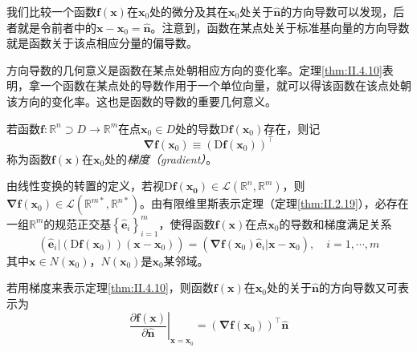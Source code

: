 \documentclass[../main.tex]{subfiles}
\begin{document}
我们比较一个函数$\mathbf{f}\left(\mathbf{x}\right)$在$\mathbf{x}_0$处的微分及其在$\mathbf{x}_0$处关于$\mathbf{\hat{n}}$的方向导数可以发现，后者就是令前者中的$\mathbf{x}-\mathbf{x}_0=\mathbf{\hat{n}}$。注意到，函数在某点处关于标准基向量的方向导数就是函数关于该点相应分量的偏导数。

方向导数的几何意义是函数在某点处朝相应方向的变化率。定理\ref{thm:II.4.10}表明，拿一个函数在某点处的导数作用于一个单位向量，就可以得该函数在该点处朝该方向的变化率。这也是函数的导数的重要几何意义。

\begin{definition}[向量函数的梯度]\label{def:II.4.19}
    若函数$\mathbf{f}:\mathbb{R}^n\supset D\rightarrow\mathbb{R}^m$在点$\mathbf{x}_0\in D$处的导数$\mathrm{D}\mathbf{f}\left(\mathbf{x}_0\right)$存在，则记
    \[\mathbf{\nabla}\mathbf{f}\left(\mathbf{x}_0\right)\equiv\left(\mathrm{D}\mathbf{f}\left(\mathbf{x}_0\right)\right)^\intercal\]
    称为函数$\mathbf{f}\left(\mathbf{x}\right)$在$\mathbf{x}_0$处的\emph{梯度（gradient）}。
\end{definition}

由线性变换的转置的定义，若视$\mathrm{D}\mathbf{f}\left(\mathbf{x_0}\right)\in\mathcal{L}\left(\mathbb{R}^n,\mathbb{R}^m\right)$，则$\mathbf{\nabla}\mathbf{f}\left(\mathbf{x}_0\right)\in\mathcal{L}\left(\mathbb{R}^{m*},\mathbb{R}^{n*}\right)$。由有限维里斯表示定理（定理\ref{thm:II.2.19}），必存在一组$\mathbb{R}^m$的规范正交基$\left\{\mathbf{\hat{e}}_i\right\}_{i=1}^m$，使得函数$\mathbf{f}\left(\mathbf{x}\right)$在点$\mathbf{x}_0$的导数和梯度满足关系
\[\left(\mathbf{\hat{e}}_i|\left(\mathrm{D}\mathbf{f}\left(\mathbf{x}_0\right)\right)\left(\mathbf{x}-\mathbf{x}_0\right)\right)=\left(\mathbf{\nabla}\mathbf{f}\left(\mathbf{x}_0\right)\mathbf{\hat{e}}_i|\mathbf{x}-\mathbf{x}_0\right),\quad i=1,\cdots,m\]
其中$\mathbf{x}\in N\left(\mathbf{x}_0\right)$，$N\left(\mathbf{x}_0\right)$是$\mathbf{x}_0$某邻域。

若用梯度来表示定理\ref{thm:II.4.10}，则函数$\mathbf{f}\left(\mathbf{x}\right)$在$\mathbf{x}_0$处的关于$\mathbf{\hat{n}}$的方向导数又可表示为
\[\left.\frac{\partial\mathbf{f}\left(\mathbf{x}\right)}{\partial \mathbf{\hat{n}}}\right|_{\mathbf{x}=\mathbf{x}_0}=\left(\mathbf{\nabla}\mathbf{f}\left(\mathbf{x}_0\right)\right)^\intercal\mathbf{\hat{n}}\]
\end{document}
